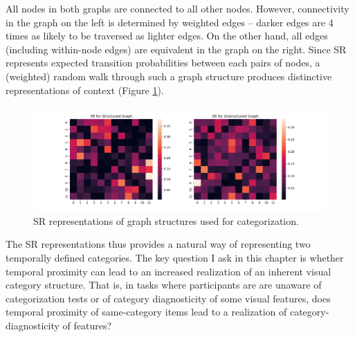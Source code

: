 All nodes in both graphs are connected to all other nodes. However, connectivity in the graph on the left is determined by weighted edges -- darker edges are 4 times as likely to be traversed as lighter edges. On the other hand, all edges (including within-node edges) are equivalent in the graph on the right. Since SR represents expected transition probabilities between each pairs of nodes, a (weighted) random walk through such a graph structure produces distinctive representations of context (Figure \ref{fig:category-sr-sims}).

\begin{figure}
    \centering
    \includegraphics[width = \textwidth]{chapter_notebooks/chapter_4/figures/category-sr-sims.png}
    \caption{SR representations of graph structures used for categorization.}
    \label{fig:category-sr-sims}
\end{figure}

The SR representations thus provides a natural way of representing two temporally defined categories. The key question I ask in this chapter is whether temporal proximity can lead to an increased realization of an inherent visual category structure. That is, in tasks where participants are are unaware of categorization tests or of category diagnosticity of some visual features, does temporal proximity of same-category items lead to a realization of category-diagnosticity of features?

